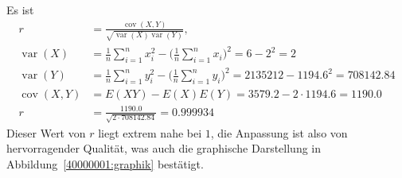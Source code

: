 \begin{loesung}
\begin{teilaufgaben}
Es ist
\begin{align*}
r
&=
\frac{\operatorname{cov}(X,Y)}{\sqrt{\operatorname{var}(X)\operatorname{var}(Y)}},
\\
\operatorname{var}(X)
&=
\frac1n\sum_{i=1}^nx_i^2-\biggl(\frac1n\sum_{i=1}^nx_i\biggr)^2
=
6-2^2=2
\\
\operatorname{var}(Y)
&=
\frac1n\sum_{i=1}^ny_i^2-\biggl(\frac1n\sum_{i=1}^ny_i\biggr)^2
=
2135212-1194.6^2=708142.84
\\
\operatorname{cov}(X,Y)
&=
E(XY)-E(X)E(Y)=3579.2-2\cdot 1194.6=1190.0
\\
r&=\frac{1190.0}{\sqrt{2\cdot 708142.84}}=0.999934
\end{align*}
Dieser Wert von $r$ liegt extrem nahe bei $1$, die Anpassung ist also von
hervorragender Qualität, was auch die graphische Darstellung
in Abbildung~\ref{40000001:graphik} bestätigt.
\qedhere
\end{teilaufgaben}
\end{loesung}
